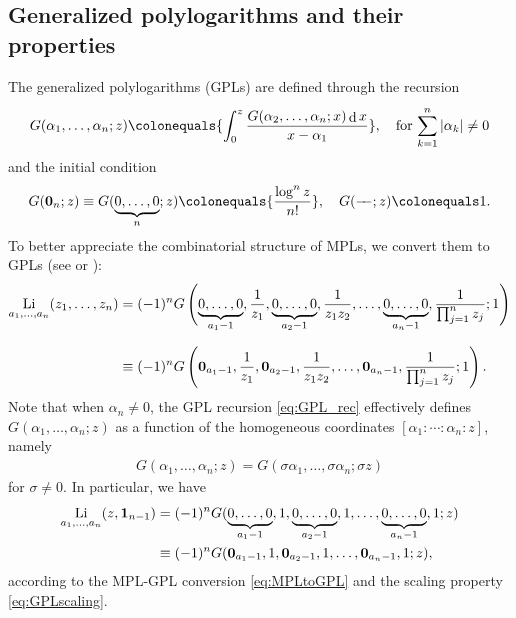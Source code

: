 \documentclass[final,notitlepage,12pt,reqno]{amsart}
\DeclareMathOperator{\Li}{Li}
\DeclareMathOperator{\D}{d}
\theoremstyle{plain}
\theoremstyle{definition}
\numberwithin{equation}{section}
\begin{document}
\subsection{Generalized polylogarithms and their properties\label{subsec:GPLprop}}
The generalized polylogarithms (GPLs) are   defined through the recursion \cite[(2.1)]{Frellesvig2016} \begin{align}\notag\\[-12pt]
G(\alpha_{1},\dots,\alpha_n;z)\colonequals{\displaystyle\int_0^z\frac{G(\alpha_2,\dots,\alpha_n;x)\D x}{x-\alpha_1}},\quad\text{for }\displaystyle\smash[t]{\sum_{k=1}^n|}\alpha_k|\neq0\label{eq:GPL_rec}
\end{align}and the initial condition \cite[(2.2)]{Frellesvig2016}\begin{align}
{ G(\boldsymbol0_{n};z)\equiv G(\underset{n }{\underbrace{0,\dots,0 }};z)}\colonequals{\dfrac{\log^nz}{n!}},\quad G(-\!\!-;z)\colonequals1.\label{eq:GPL0}
\end{align}To better appreciate the combinatorial structure of MPLs, we convert them to GPLs  (see \cite[(2.5)]{Frellesvig2016} or \cite[(1.3)]{Panzer2015}): \begin{align}
\begin{split}\Li_{a_1,\dots,a_n}(z_1,\dots,z_n)={}&(-1)^{n}G\left(\smash[b]{\underset{a_1-1 }{\underbrace{0,\dots,0 }}},\frac{1}{z_{1}},\smash[b]{\underset{a_2-1 }{\underbrace{0,\dots,0 }}},\frac{1}{z_{1}z_2},\dots,\smash[b]{\underset{a_n-1 }{\underbrace{0,\dots,0 }}},\frac{1}{\prod_{j=1}^nz_j};1\right)\\[-5pt]\\\equiv{}&(-1)^nG\left(  \boldsymbol0_{a_{1}-1},\frac{1}{z_{1}},\boldsymbol0_{a_{2}-1},\frac{1}{z_{1}z_2},\dots,\boldsymbol0_{a_{n}-1},\frac{1}{\prod_{j=1}^nz_j};1\right).
\end{split}\label{eq:MPLtoGPL}
\end{align}Note that when  $ \alpha_n\neq0$, the GPL recursion \eqref{eq:GPL_rec} effectively defines $G(\alpha_{1},\dots,\alpha_n;z)$ as a function of the homogeneous coordinates $ [\alpha_{1}:\cdots:\alpha_n:z]$, namely  \cite[(2.3)]{Frellesvig2016}
\begin{align}
G(\alpha_{1},\dots,\alpha_n;z)=G(\sigma\alpha_{1},\dots,\sigma\alpha_n;\sigma z)\label{eq:GPLscaling}
\end{align}for $\sigma\neq0 $.
In particular, we have\begin{align}
\begin{split}\begin{split}\Li_{a_1,\dots,a_n}(z,\mathbf 1_{n-1})={}&(-1)^{n}G({\underset{a_1-1 }{\underbrace{0,\dots,0 }}},1,{\underset{a_2-1 }{\underbrace{0,\dots,0 }}},1,\dots,\smash[b]{\underset{a_n-1 }{\underbrace{0,\dots,0 }}},1;z)\\\equiv{}&(-1)^{n}G(\boldsymbol0_{a_1-1},1,\boldsymbol0_{a_2-1},1,\dots,\boldsymbol0_{a_n-1},1;z),
\end{split}\label{eq:LtoGPL}
\end{split}
\end{align}according to the MPL-GPL conversion \eqref{eq:MPLtoGPL}  and the scaling property \eqref{eq:GPLscaling}.
\end{document}
